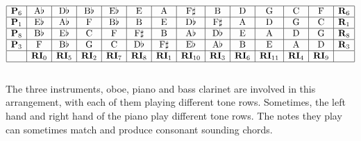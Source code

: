 \documentclass[a4paper]{article}
\begin{document}
\[\begin{array}{|c|c|c|c|c|c|c|c|c|c|c|c|c|c|}
\hline
\mathbf{P}_6&\mathrm{A}\flat&\mathrm{D}\flat&\mathrm{B}\flat&\mathrm{E}\flat&\mathrm{E}&\mathrm{A}&\mathrm{F}\sharp&\mathrm{B}&\mathrm{D}&\mathrm{G}&\mathrm{C}&\mathrm{F}&\mathbf{R}_6\\
\hline
\mathbf{P}_1&\mathrm{E}\flat&\mathrm{A}\flat&\mathrm{F}&\mathrm{B}\flat&\mathrm{B}&\mathrm{E}&\mathrm{D}\flat&\mathrm{F}\sharp&\mathrm{A}&\mathrm{D}&\mathrm{G}&\mathrm{C}&\mathbf{R}_1\\
\hline
\mathbf{P}_8&\mathrm{B}\flat&\mathrm{E}\flat&\mathrm{C}&\mathrm{F}&\mathrm{F}\sharp&\mathrm{B}&\mathrm{A}\flat&\mathrm{D}\flat&\mathrm{E}&\mathrm{A}&\mathrm{D}&\mathrm{G}&\mathbf{R}_8\\
\hline
\mathbf{P}_3&\mathrm{F}&\mathrm{B}\flat&\mathrm{G}&\mathrm{C}&\mathrm{D}\flat&\mathrm{F}\sharp&\mathrm{E}\flat&\mathrm{A}\flat&\mathrm{B}&\mathrm{E}&\mathrm{A}&\mathrm{D}&\mathbf{R}_3\\
\hline
&\mathbf{RI}_0&\mathbf{RI}_5&\mathbf{RI}_2&\mathbf{RI}_7&\mathbf{RI}_8&\mathbf{RI}_1&\mathbf{RI}_{10}&\mathbf{RI}_3&\mathbf{RI}_6&\mathbf{RI}_{11}&\mathbf{RI}_4&\mathbf{RI}_9&\\
\hline
\end{array}\]
\\
The three instruments, oboe, piano and bass clarinet are involved in this arrangement, with each of them playing different tone rows. Sometimes, the left hand and right hand of the piano play different tone rows. The notes they play can sometimes match and produce consonant sounding chords.
\end{document}

